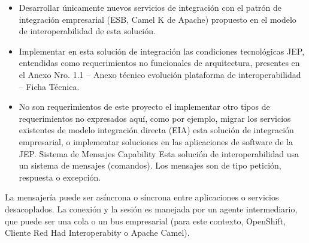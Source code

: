 \documentclass[
  paper=a4,
  ,captions=tableheading
]{scrartcl}
\providecommand{\tightlist}{%
  \setlength{\itemsep}{0pt}\setlength{\parskip}{0pt}}
\begin{document}
\begin{itemize}
\tightlist
\item
  Desarrollar únicamente nuevos servicios de integración con el patrón
  de integración empresarial (ESB, Camel K de Apache) propuesto en el
  modelo de interoperabilidad de esta solución.
\item
  Implementar en esta solución de integración las condiciones
  tecnológicas JEP, entendidas como requerimientos no funcionales de
  arquitectura, presentes en el Anexo Nro. 1.1 -- Anexo técnico
  evolución plataforma de interoperabilidad -- Ficha Técnica.
\item
  No son requerimientos de este proyecto el implementar otro tipos de
  requerimientos no expresados aquí, como por ejemplo, migrar los
  servicios existentes de modelo integración directa (EIA) esta solución
  de integración empresarial, o implementar soluciones en las
  aplicaciones de software de la JEP. \textbar{} \textbar{} Sistema de
  Mensajes \textbar{} Capability \textbar{} Esta solución de
  interoperabilidad usa un sistema de mensajes (comandos). Los mensajes
  son de tipo petición, respuesta o excepción.
\end{itemize}

La mensajería puede ser asíncrona o síncrona entre aplicaciones o
servicios desacoplados. La conexión y la sesión es manejada por un
agente intermediario, que puede ser una cola o un bus empresarial (para
este contexto, OpenShift, Cliente Red Had Interoperabity o Apache
Camel).
\end{document}

